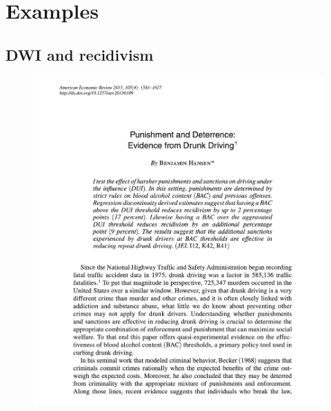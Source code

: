 \documentclass{beamer}
\begin{document}
\section{Examples}

\subsection{DWI and recidivism}

\begin{frame}

	\begin{figure}
	\includegraphics[scale=0.35]{./lecture_includes/hansen_aer_fig}
	\end{figure}
\end{frame}
\end{document}
